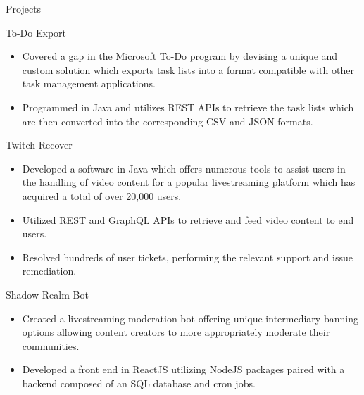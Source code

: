 \documentclass{article}
\newlength{\tabin}
\newlength{\secsep}
\newcommand{\lineunder}{\vspace*{-8pt} \\ \hspace*{-6pt} \hrulefill \\ \vspace*{-15pt}}
\newenvironment{tabbedsection}[1]{
  \begin{list}{}{
      \setlength{\itemsep}{0pt}
      \setlength{\labelsep}{0pt}
      \setlength{\labelwidth}{0pt}
      \setlength{\leftmargin}{\tabin}
      \setlength{\rightmargin}{\tabin}
      \setlength{\listparindent}{0pt}
      \setlength{\parsep}{0pt}
      \setlength{\parskip}{0pt}
      \setlength{\partopsep}{0pt}
      \setlength{\topsep}{#1}
    }
  \item[]
}{\end{list}}
\newenvironment{resume_section}[1]{
  \filbreak
  \vspace{2\secsep}
  \textsc{\large#1}
  \lineunder
  \begin{tabbedsection}{\secsep}
}{\end{tabbedsection}}
\newenvironment{resume_subsection}[2][]{
  \textbf{#2} \hfill {\normalsize #1} \hspace{-5em}
  \begin{tabbedsection}{0.5\secsep}
}{\end{tabbedsection}}
\newenvironment{subitems}{
  \renewcommand{\labelitemi}{-}
  \begin{itemize}
      \setlength{\labelsep}{1em}
}{\end{itemize}}
\begin{document}
\begin{resume_section}{Projects}
	\begin{resume_subsection}[(February 2021)]{To-Do Export}
  		\begin{subitems} 
  			\item Covered a gap in the Microsoft To-Do program by devising a unique and custom solution which exports task lists into a format compatible with other task management applications.
  			\item Programmed in Java and utilizes REST APIs to retrieve the task lists which are then converted into the corresponding CSV and JSON formats.
    		\end{subitems}
  	\end{resume_subsection}
  	\vspace{3\secsep}
	\begin{resume_subsection}{Twitch Recover}  
		\begin{subitems}
    			\item Developed a software in Java which offers numerous tools to assist users in the handling of video content for a popular livestreaming platform which has acquired a total of over 20,000 users.
    			\item Utilized REST and GraphQL APIs to retrieve and feed video content to end users.
    			\item Resolved hundreds of user tickets, performing the relevant support and issue remediation.
		\end{subitems}
	\end{resume_subsection}
	\vspace{3\secsep}
	\begin{resume_subsection}{Shadow Realm Bot}
		\begin{subitems}
			\item Created a livestreaming moderation bot offering unique intermediary banning options allowing content creators to more appropriately moderate their communities.
			\item Developed a front end in ReactJS utilizing NodeJS packages paired with a backend composed of an SQL database and cron jobs.

\end{subitems}
\end{resume_subsection}
\end{resume_section}
\end{document}
